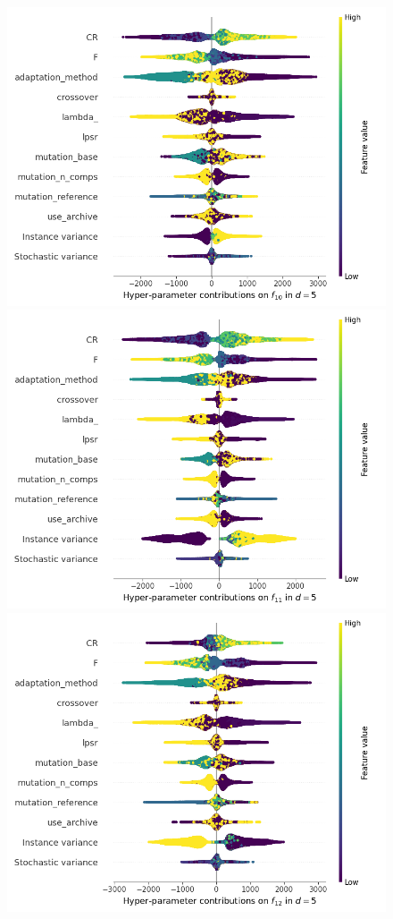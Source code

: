 \begin{figure}[t]
	\includegraphics[height=0.15\textheight,trim=60mm 0mm 30mm 0mm,clip]{de_img_new/img_summary_f10_d5.png}
	\includegraphics[height=0.15\textheight,trim=60mm 0mm 30mm 0mm,clip]{de_img_new/img_summary_f11_d5.png}
	\includegraphics[height=0.15\textheight,trim=60mm 0mm 0mm 0mm,clip]{de_img_new/img_summary_f12_d5.png}

\end{figure}
